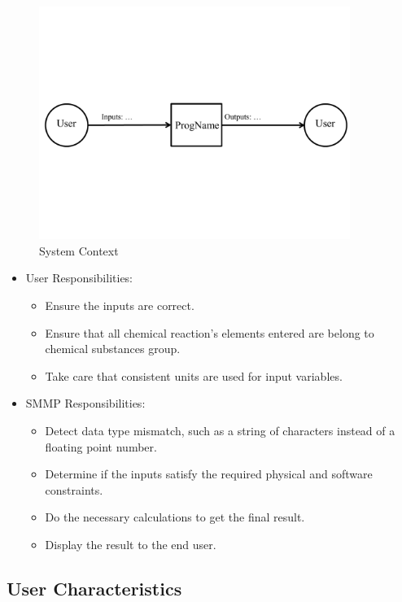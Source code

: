 \documentclass[12pt]{article}
\begin{document}
\begin{figure}[h!]
\begin{center}
 \includegraphics[width=0.9\textwidth]{SystemContextFigure}
\caption{System Context}
\label{Fig_SystemContext} 
\end{center}
\end{figure}


\begin{itemize}
\item User Responsibilities:
\begin{itemize}
\item Ensure the inputs are correct.
\item Ensure that all chemical reaction's elements entered are belong to
  chemical substances group.
\item Take care that consistent units are used for input variables.
\end{itemize}
\item SMMP Responsibilities:
\begin{itemize}
\item Detect data type mismatch, such as a string of characters instead of a
  floating point number.
\item Determine if the inputs satisfy the required physical and software
  constraints.
\item Do the necessary calculations to get the final result.
\item Display the result to the end user.
\end{itemize}
\end{itemize}

\subsection{User Characteristics} \label{SecUserCharacteristics}
\end{document}
